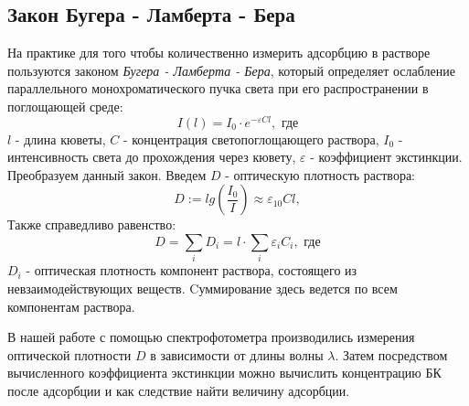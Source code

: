 \documentclass[a4paper,12pt]{article} %
\begin{document}
\subsection*{Закон Бугера - Ламберта - Бера}
На практике для того чтобы количественно измерить адсорбцию в растворе пользуются законом  \textit{Бугера - Ламберта - Бера}, который определяет ослабление параллельного монохроматического пучка света при его распространении в поглощающей среде:
\begin{equation}
    I(l) = I_0 \cdot e^{-\varepsilon Cl}, \textrm{ где}
    \label{blb}
\end{equation}
  $l$ - длина кюветы, 
  \newline $C$ - концентрация светопоглощающего раствора, \newline $I_0$ - интенсивность света до прохождения через кювету, 
  \newline $\varepsilon$ - коэффициент экстинкции.
\newline
Преобразуем данный закон. Введем $D$ - оптическую плотность раствора:
\begin{equation}
    D := lg(\dfrac{I_0}{I}) \approx \varepsilon_{10}Cl,
\end{equation}
 Также справедливо равенство:
\begin{equation}
    D = \sum_{i}D_i= l \cdot \sum_{i}\varepsilon_iC_i, \textrm{ где}
    \label{add}
\end{equation}
$D_i$ - оптическая плотность компонент раствора, состоящего из невзаимодействующих веществ. 
\newline Cуммирование здесь ведется по всем компонентам раствора.
\par
В нашей работе с помощью спектрофотометра производились измерения оптической плотности $D$ в зависимости от длины волны $\lambda$. Затем посредством вычисленного коэффициента экстинкции можно вычислить концентрацию БК после адсорбции и как следствие найти величину адсорбции.
\end{document}
